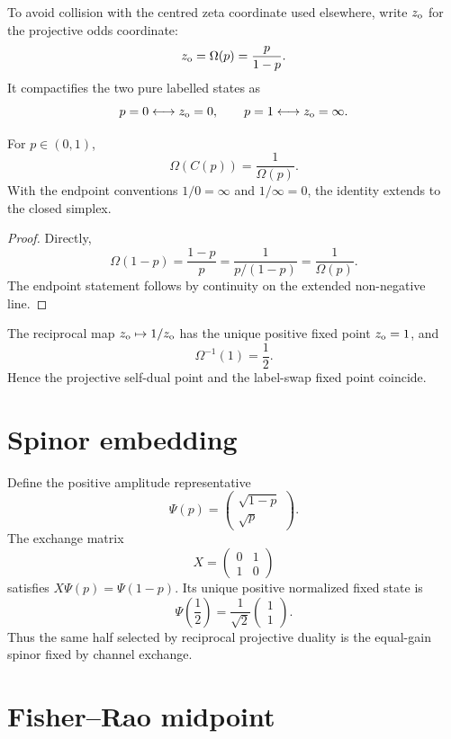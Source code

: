 To avoid collision with the centred zeta coordinate used elsewhere, write
$z_{\rm o}$ for the projective odds coordinate:
\[
 z_{\rm o}=\Omega(p)=\frac{p}{1-p}.
\]
It compactifies the two pure labelled states as
\[
 p=0\longleftrightarrow z_{\rm o}=0,
 \qquad
 p=1\longleftrightarrow z_{\rm o}=\infty.
\]

\begin{theorem}
\label{thm:zero-undefined-conjugacy}
For $p\in(0,1)$,
\[
 \Omega(C(p))=\frac1{\Omega(p)}.
\]
With the endpoint conventions $1/0=\infty$ and $1/\infty=0$, the identity
extends to the closed simplex.
\end{theorem}

\begin{proof}
Directly,
\[
 \Omega(1-p)=\frac{1-p}{p}
 =\frac1{p/(1-p)}
 =\frac1{\Omega(p)}.
\]
The endpoint statement follows by continuity on the extended non-negative
line.
\end{proof}

\begin{corollary}
\label{cor:zero-undefined-half}
The reciprocal map $z_{\rm o}\mapsto1/z_{\rm o}$ has the unique positive fixed
point $z_{\rm o}=1$, and
\[
 \Omega^{-1}(1)=\frac12.
\]
Hence the projective self-dual point and the label-swap fixed point coincide.
\end{corollary}

\section{Spinor embedding}

Define the positive amplitude representative
\[
 \Psi(p)=
 \begin{pmatrix}
 \sqrt{1-p}\\
 \sqrt p
 \end{pmatrix}.
\]
The exchange matrix
\[
 X=\begin{pmatrix}0&1\\1&0\end{pmatrix}
\]
satisfies $X\Psi(p)=\Psi(1-p)$. Its unique positive normalized fixed state is
\[
 \Psi\!\left(\frac12\right)
 =\frac1{\sqrt2}
 \begin{pmatrix}1\\1\end{pmatrix}.
\]
Thus the same half selected by reciprocal projective duality is the equal-gain
spinor fixed by channel exchange.

\section{Fisher--Rao midpoint}

